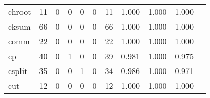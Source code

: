 \begin{longtable}{lp{1.2cm}p{1.2cm}p{1.2cm}p{1.2cm}p{1.2cm}p{1.2cm}p{1.2cm}p{1.2cm}p{1.2cm}p{1.2cm}}
chroot    &                                    11 &                                                  0 &                                                  0 &                                                  0 &                                                  0 &                                                 11 &                                              1.000 &                                              1.000 &                                              1.000 \\
cksum     &                                    66 &                                                  0 &                                                  0 &                                                  0 &                                                  0 &                                                 66 &                                              1.000 &                                              1.000 &                                              1.000 \\
comm      &                                    22 &                                                  0 &                                                  0 &                                                  0 &                                                  0 &                                                 22 &                                              1.000 &                                              1.000 &                                              1.000 \\
cp        &                                    40 &                                                  0 &                                                  1 &                                                  0 &                                                  0 &                                                 39 &                                              0.981 &                                              1.000 &                                              0.975 \\
csplit    &                                    35 &                                                  0 &                                                  0 &                                                  1 &                                                  0 &                                                 34 &                                              0.986 &                                              1.000 &                                              0.971 \\
cut       &                                    12 &                                                  0 &                                                  0 &                                                  0 &                                                  0 &                                                 12 &                                              1.000 &                                              1.000 &                                              1.000 \\

\end{longtable}
